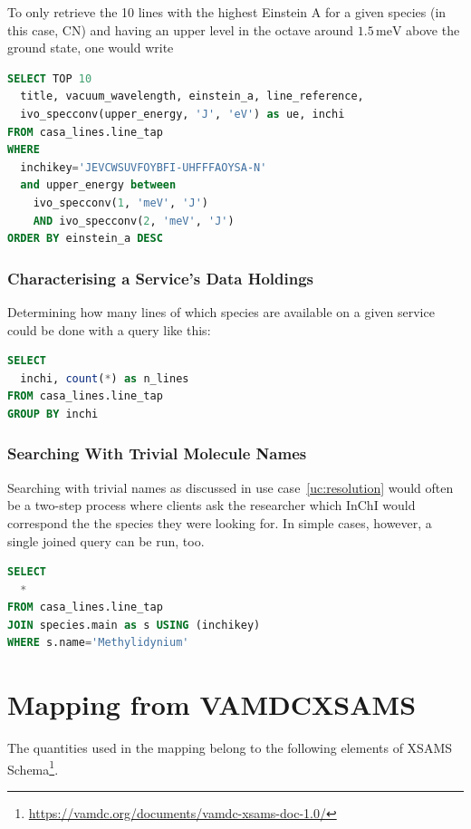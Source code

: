 \documentclass[11pt,a4paper]{ivoa}
\begin{document}
To only retrieve the 10 lines with the highest Einstein A for a given
species (in this case, CN) and having an upper level in the octave
around
$1.5\,\textrm{meV}$ above the ground state, one would write

\begin{lstlisting}[language=SQL]
SELECT TOP 10
  title, vacuum_wavelength, einstein_a, line_reference,
  ivo_specconv(upper_energy, 'J', 'eV') as ue, inchi
FROM casa_lines.line_tap
WHERE
  inchikey='JEVCWSUVFOYBFI-UHFFFAOYSA-N'
  and upper_energy between
    ivo_specconv(1, 'meV', 'J')
    AND ivo_specconv(2, 'meV', 'J')
ORDER BY einstein_a DESC
\end{lstlisting}


\subsubsection{Characterising a Service's Data Holdings}

Determining how many lines of which species are available on a given
service could be done with a query like this:

\begin{lstlisting}[language=SQL]
SELECT
  inchi, count(*) as n_lines
FROM casa_lines.line_tap
GROUP BY inchi
\end{lstlisting}

\subsubsection{Searching With Trivial Molecule Names}

Searching with trivial names as discussed in use
case~\ref{uc:resolution} would often be a two-step process where clients
ask the researcher which InChI would correspond the the species they
were looking for.  In simple cases, however, a single joined query can be
run, too.

\begin{lstlisting}[language=SQL]
SELECT
  *
FROM casa_lines.line_tap
JOIN species.main as s USING (inchikey)
WHERE s.name='Methylidynium'
\end{lstlisting}


\section{Mapping from VAMDCXSAMS}
\label{sect:mapping}

The quantities used in the mapping belong to the following elements of XSAMS
Schema\footnote{\url{https://vamdc.org/documents/vamdc-xsams-doc-1.0/}\label{fn:schema}}.
\end{document}
